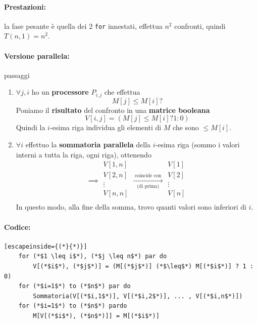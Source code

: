 \documentclass[11pt]{article}
\begin{document}
	
	\paragraph{Prestazioni:} la fase pesante è quella dei 2 \texttt{for} innestati, effettua $n^2$ confronti, quindi $T(n,1) = n^2$.\\
	
	\newpage
	
	\paragraph{Versione parallela:} passaggi
	
	\begin{enumerate}
		\item $\forall j,i$ ho un \textbf{processore} $P_{i,j}$ che effettua 
		$$ M[j] \leq M[i] ? $$
		Poniamo il \textbf{risultato} del confronto in una \textbf{matrice booleana}
		$$ V[i,j] = (M[j] \leq M[i] ? 1 : 0 )$$
		Quindi la $i$-esima riga individua gli elementi di $M$ che sono $\leq M[i]$.\\
		
		\item $\forall i$ effettuo la \textbf{sommatoria parallela} della $i$-esima riga (sommo i valori interni a tutta la riga, ogni riga), ottenendo
		$$
		\implies \begin{array}{c}
			V[1,n] \\
			V[2,n] \\
			\vdots \\
			V[n,n] \\
		\end{array}
		\xrightarrow[\text{ (di prima) }]{\text{ coincide con }}
		\begin{array}{c}
			V[1] \\
			V[2] \\
			\vdots \\
			V[n] \\
		\end{array}
		$$
		In questo modo, alla fine della somma, trovo quanti valori sono inferiori di $i$.\\
	\end{enumerate}
	
	\paragraph{Codice:} 
	\begin{lstlisting}[escapeinside={(*}{*)}]
	for (*$1 \leq i$*), (*$j \leq n$*) par do
		V[(*$i$*), (*$j$*)] = (M[(*$j$*)] (*$\leq$*) M[(*$i$*)] ? 1 : 0)
	for (*$i=1$*) to (*$n$*) par do
		Sommatoria(V[(*$i,1$*)], V[(*$i,2$*)], ... , V[(*$i,n$*)])
	for (*$i=1$*) to (*$n$*) pardo
		M[V[(*$i$*), (*$n$*)]] = M[(*$i$*)]
	\end{lstlisting}
	
\end{document}
